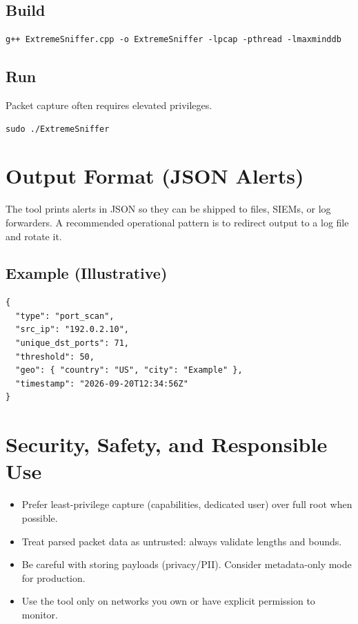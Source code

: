 \documentclass[14pt]{extarticle}
\begin{document}
\subsection{Build}
\begin{lstlisting}[caption={Example build command.},label={lst:build}]
g++ ExtremeSniffer.cpp -o ExtremeSniffer -lpcap -pthread -lmaxminddb
\end{lstlisting}

\subsection{Run}
Packet capture often requires elevated privileges.
\begin{lstlisting}[caption={Example run command.},label={lst:run}]
sudo ./ExtremeSniffer
\end{lstlisting}

\section{Output Format (JSON Alerts)}
The tool prints alerts in JSON so they can be shipped to files, SIEMs, or log forwarders. A recommended operational pattern is to redirect output to a log file and rotate it.

\subsection{Example (Illustrative)}
\begin{lstlisting}[caption={Illustrative alert example (fields may vary by build/config).},label={lst:json}]
{
  "type": "port_scan",
  "src_ip": "192.0.2.10",
  "unique_dst_ports": 71,
  "threshold": 50,
  "geo": { "country": "US", "city": "Example" },
  "timestamp": "2026-09-20T12:34:56Z"
}
\end{lstlisting}

\section{Security, Safety, and Responsible Use}
\begin{itemize}
  \item Prefer least-privilege capture (capabilities, dedicated user) over full root when possible.
  \item Treat parsed packet data as untrusted: always validate lengths and bounds.
  \item Be careful with storing payloads (privacy/PII). Consider metadata-only mode for production.
  \item Use the tool only on networks you own or have explicit permission to monitor.
\end{itemize}
\end{document}

